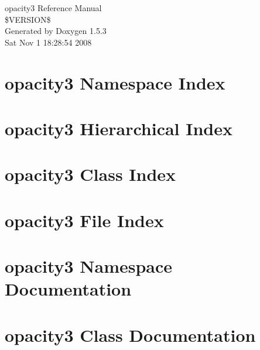 \documentclass[a4paper]{book}
\begin{document}
\begin{titlepage}
\vspace*{7cm}
\begin{center}
{\Large opacity3 Reference Manual\\[1ex]\large \$VERSION\$ }\\
\vspace*{1cm}
{\large Generated by Doxygen 1.5.3}\\
\vspace*{0.5cm}
{\small Sat Nov 1 18:28:54 2008}\\
\end{center}
\end{titlepage}
\clearemptydoublepage
{}
\tableofcontents
\clearemptydoublepage
{}
\chapter{opacity3 Namespace Index}

\chapter{opacity3 Hierarchical Index}

\chapter{opacity3 Class Index}

\chapter{opacity3 File Index}

\chapter{opacity3 Namespace Documentation}






\chapter{opacity3 Class Documentation}































\end{document}
